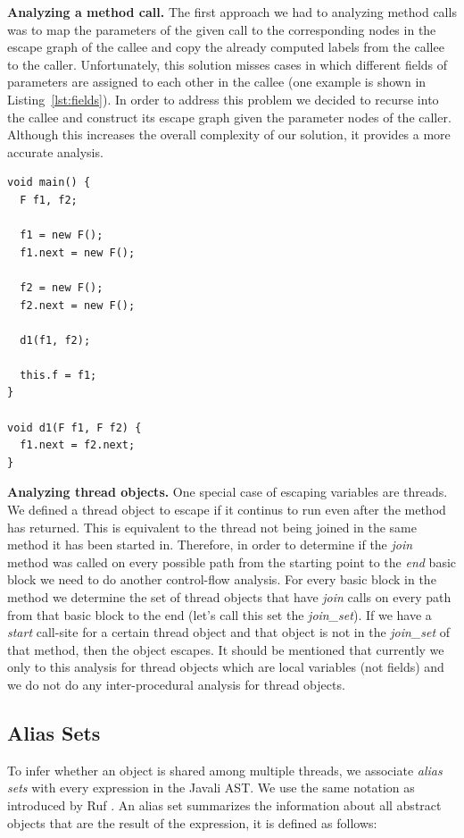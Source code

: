 \documentclass[letterpaper]{article}
\newcommand{\mypar}[1]{{\bf #1.}}
\begin{document}
\mypar{Analyzing a method call} The first approach we had to analyzing method calls was to map the parameters of the given
call to the corresponding nodes in the escape graph of the callee and copy the already computed labels from the callee to the
caller. Unfortunately, this solution misses cases in which different fields of parameters are assigned to each other in the callee
(one example is shown in Listing~\ref{lst:fields}). In order to address this problem we decided to recurse into the callee and
construct its escape graph given the parameter nodes of the caller. Although this increases the overall complexity of our solution,
it provides a more accurate analysis.

\begin{lstlisting}[caption=Field parameter assignment, label=lst:fields]
void main() {
  F f1, f2;

  f1 = new F();
  f1.next = new F();

  f2 = new F();
  f2.next = new F();

  d1(f1, f2);

  this.f = f1;
}

void d1(F f1, F f2) {
  f1.next = f2.next;
}
\end{lstlisting}

\mypar{Analyzing thread objects} One special case of escaping variables are threads. We defined a thread object to escape if
it continus to run even after the method has returned. This is equivalent to the thread not being joined in the same method it has
been started in.
Therefore, in order to determine if the \textit{join} method was called on every possible path from the starting point
to the \textit{end} basic block we need to do another control-flow analysis. For every basic block in the method we 
determine the set of thread objects that have \textit{join} calls on every path from that basic block to the end (let's call this set the \textit{join\_set}).
If we have a \textit{start} call-site for a certain thread object and that object is not in the \textit{join\_set} of that
method, then the object escapes.
It should be mentioned that currently we only to this analysis for thread objects which are local variables (not fields) and we do not do any inter-procedural analysis for thread objects.

\subsection{Alias Sets}

To infer whether an object is shared among multiple threads, we associate \emph{alias sets}
with every expression in the Javali AST. We use the same notation as introduced by Ruf \cite{Ruf:00}.
An alias set summarizes the information about all abstract objects that are the result of the expression, it is defined as follows:
\end{document}
